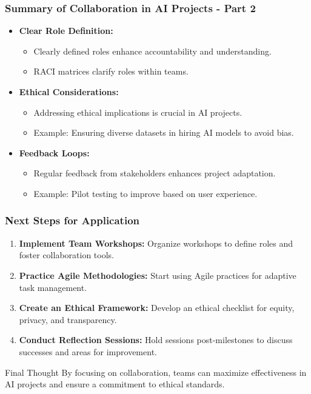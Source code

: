 \documentclass[aspectratio=169]{beamer}
\begin{document}
\begin{frame}[fragile]
    \frametitle{Summary of Collaboration in AI Projects - Part 2}
    \begin{itemize}
        \item \textbf{Clear Role Definition:}
        \begin{itemize}
            \item Clearly defined roles enhance accountability and understanding.
            \item RACI matrices clarify roles within teams.
        \end{itemize}

        \item \textbf{Ethical Considerations:}
        \begin{itemize}
            \item Addressing ethical implications is crucial in AI projects. 
            \item Example: Ensuring diverse datasets in hiring AI models to avoid bias.
        \end{itemize}
        
        \item \textbf{Feedback Loops:}
        \begin{itemize}
            \item Regular feedback from stakeholders enhances project adaptation.
            \item Example: Pilot testing to improve based on user experience.
        \end{itemize}
    \end{itemize}
\end{frame}

\begin{frame}[fragile]
    \frametitle{Next Steps for Application}
    \begin{enumerate}
        \item \textbf{Implement Team Workshops:} 
        Organize workshops to define roles and foster collaboration tools.
        
        \item \textbf{Practice Agile Methodologies:} 
        Start using Agile practices for adaptive task management.

        \item \textbf{Create an Ethical Framework:} 
        Develop an ethical checklist for equity, privacy, and transparency.

        \item \textbf{Conduct Reflection Sessions:}
        Hold sessions post-milestones to discuss successes and areas for improvement.
    \end{enumerate}

    \begin{block}{Final Thought}
        By focusing on collaboration, teams can maximize effectiveness in AI projects and ensure a commitment to ethical standards. 
    \end{block}
\end{frame}
\end{document}
